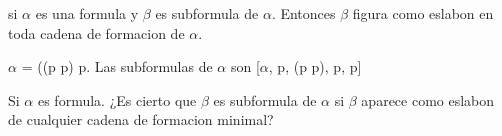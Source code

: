 \begin{exercise}
si $\alpha$ es una formula y $\beta$ es subformula de $\alpha$. Entonces $\beta$ figura como eslabon en toda cadena de formacion de $\alpha$.
\end{exercise}

\begin{example}
$\alpha$ = ((p \then p) \clor p. Las subformulas de $\alpha$ son [$\alpha$, p, (p \then p), p, p]
\end{example}

\begin{problem}
Si $\alpha$ es formula. ¿Es cierto que $\beta$ es subformula de $\alpha$ si $\beta$ aparece como eslabon de cualquier cadena de formacion minimal?
\end{problem}
